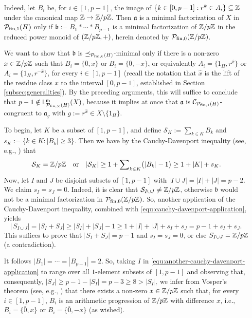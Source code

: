 \begin{eg}
	Indeed, let $B_i$ be, for $i \in [ 1, p-1 ]$, the image of $\{k \in [ 0, p-1 ]: r^k \in A_i\} \subseteq \mathbb{Z}$ under the canonical map $\mathbb{Z} \to \mathbb{Z}/p\mathbb{Z}$. Then $\mathfrak a$ is a minimal factorization of $X$ in $\mathcal P_{\textrm{fin},1}(H)$ only if $\mathfrak b := B_1 \ast \cdots \ast B_{p-1}$ is a minimal factorization of $\mathbb{Z}/p\mathbb{Z}$ in the reduced power monoid of $(\mathbb{Z}/p\mathbb{Z}, +)$, herein denoted by $\mathcal P_{\textrm{fin},0}(\mathbb{Z}/p\mathbb{Z})$.
	
	We want to show that $\mathfrak b$ is $\preceq_{\mathcal P_{\textrm{fin},0}(H)}$-minimal only if there is a non-zero $x \in \mathbb{Z}/p\mathbb{Z}$ such that $B_i = \{\overline{0}, x\}$ or $B_i = \{\overline{0}, -x\}$, or equivalently $A_i = \{1_H, r^{\hat{x}}\}$ or $A_i = \{1_H, r^{-\hat{x}}\}$, for every $i \in [ 1, p-1 ]$ (recall the notation that $\hat{x}$ is the lift of the residue class $x$ to the interval $[0,p-1]$, established in Section \ref{subsec:generalities}). By the preceding arguments, this will suffice to conclude that $p-1 \notin \mathsf L^{\mathsf{m}}_{\mathcal P_{\textrm{fin}, \times}(H)}(X)$, because it implies at once that $\mathfrak a$ is $\mathcal C_{\mathcal P_{\textrm{fin}, 1}(H)}$-congruent to $\mathfrak a_g$ with $g := r^{\hat{x}} \in X \setminus \{1_H\}$.
	
	To begin, let $K$ be a subset of $[ 1, p-1 ]$, and define $\mathcal{S}_K := \sum_{k \in K} B_k$ and $s_K := \{k \in K: |B_k| \ge 3\}$. Then we have by the Cauchy-Davenport inequality (see, e.g., \cite[Theorem 6.2]{grynkiewicz13}) that
	\begin{equation}\label{equ:cauchy-davenport-application}
	\mathcal{S}_K = \mathbb{Z}/p\mathbb{Z} 
	\quad\text{or}\quad
	|\mathcal{S}_K| \ge 1 + {\sum}_{k \in K} \bigl(|B_k| - 1\bigr) \ge 1 + |K| + s_K.
	\end{equation}
	Now, let $I$ and $J$ be disjoint subsets of $[ 1, p-1 ]$ with $|I \cup J| = |I| + |J| = p-2$. We claim $s_I = s_J = 0$. Indeed, it is clear that $\mathcal{S}_{I \cup J} \ne \mathbb{Z}/p\mathbb{Z}$, otherwise $\mathfrak b$ would not be a minimal factorization in $\mathcal P_{\textrm{fin},0}(\mathbb{Z}/p\mathbb{Z})$. So, another application of the Cauchy-Davenport inequality, combined with \eqref{equ:cauchy-davenport-application}, yields
	\begin{equation}\label{equ:another-cauchy-davenport-application}
	|S_{I \cup J}| = |S_I + S_J| \ge |S_I| + |S_J| - 1 \ge 1 + |I| + |J| + s_I + s_J = p-1 + s_I + s_J.
	\end{equation}
	This suffices to prove that $|S_I + S_J| = p-1$ and $s_I = s_J = 0$, or else $S_{I \cup J} = \mathbb{Z}/p\mathbb{Z}$ (a contradiction). 
	
	It follows $|B_1| = \cdots = |B_{p-1}| = 2$. So, taking $I$ in \eqref{equ:another-cauchy-davenport-application} to range over all $1$-element subsets of $[ 1, p-1 ]$ and observing that, consequently, $|S_J| \ge p-1-|S_I| = p-3 \ge 8 > |S_I|$, we infer from Vosper's theorem (see, e.g., \cite[Theorem 8.1]{grynkiewicz13}) that there exists a non-zero $x \in \mathbb{Z}/p\mathbb{Z}$ such that, for every $i \in [ 1, p-1 ]$, $B_i$ is an arithmetic progression of $\mathbb{Z}/p\mathbb{Z}$ with difference $x$, i.e., $B_i = \{\overline{0}, x\}$ or $B_i = \{\overline{0}, -x\}$ (as wished).
\end{eg}



